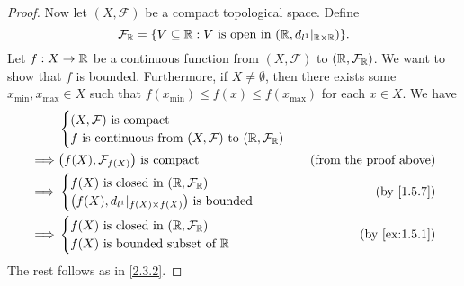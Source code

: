 \begin{proof}
  Now let \((X, \mathcal{F})\) be a compact topological space.
  Define
  \[
    \mathcal{F}_{\mathbb{R}} = \{V \subseteq \mathbb{R} : V \text{ is open in } (\mathbb{R}, d_{l^1}|_{\mathbb{R} \times \mathbb{R}})\}.
  \]
  Let \(f : X \to \mathbb{R}\) be a continuous function from \((X, \mathcal{F})\) to \((\mathbb{R}, \mathcal{F}_{\mathbb{R}})\).
  We want to show that \(f\) is bounded.
  Furthermore, if \(X \neq \emptyset\), then there exists some \(x_{\min}, x_{\max} \in X\) such that \(f(x_{\min}) \leq f(x) \leq f(x_{\max})\) for each \(x \in X\).
  We have
  \begin{align*}
             & \begin{cases}
                 (X, \mathcal{F}) \text{ is compact} \\
                 f \text{ is continuous from } (X, \mathcal{F}) \text{ to } (\R, \mathcal{F}_{\R})
               \end{cases}                                  \\
    \implies & \big(f(X), \mathcal{F}_{f(X)}\big) \text{ is compact}                             & \text{(from the proof above)} \\
    \implies & \begin{cases}
                 f(X) \text{ is closed in } (\R, \mathcal{F}_{\R}) \\
                 \big(f(X), d_{l^1}|_{f(X) \times f(X)}\big) \text{ is bounded}
               \end{cases}                    & \text{(by \cref{1.5.7})}                                                     \\
    \implies & \begin{cases}
                 f(X) \text{ is closed in } (\R, \mathcal{F}_{\R}) \\
                 f(X) \text{ is bounded subset of } \R
               \end{cases}                              & \text{(by \cref{ex:1.5.1})}
  \end{align*}
  The rest follows as in \cref{2.3.2}.
\end{proof}